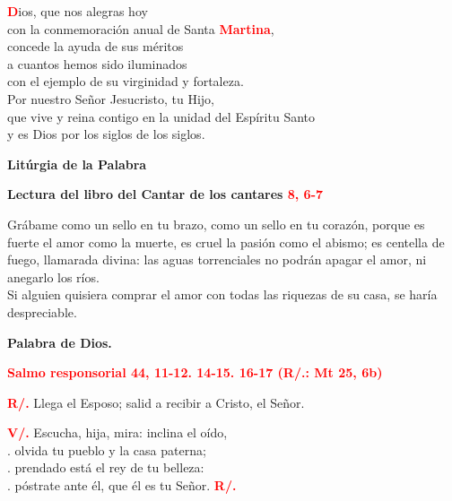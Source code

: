 \documentclass[12pt, letterpaper]{report}
\begin{document}
\lettrine[lines=1]{\bfseries \textcolor{red}{D}}{}\Large {ios,
que nos alegras hoy \\
con la conmemoraci\'on anual de Santa {\bfseries \textcolor{red}{Martina}}, \\
concede la ayuda de sus m\'eritos \\
a cuantos hemos sido iluminados \\
con el ejemplo de su virginidad y fortaleza. \\
Por nuestro Se\~nor Jesucristo, tu Hijo, \\
que vive y reina contigo en la unidad del Esp\'iritu Santo \\
y es Dios por los siglos de los siglos.}

\newpage

\begin{center}
\Huge {\bfseries Lit\'urgia de la Palabra}
\end{center}

\Large {\bfseries Lectura del libro del Cantar de los cantares \hspace{1cm} \textcolor{red}{8, 6-7}} \newline

\Large Gr\'abame como un sello en tu brazo, como un sello en tu coraz\'on, porque es fuerte el amor como la muerte, es cruel la pasi\'on como el abismo; es centella de fuego, llamarada divina: las aguas torrenciales no podr\'an apagar el amor, ni anegarlo los r\'ios. \\
Si alguien quisiera comprar el amor con todas las riquezas de su casa, se har\'ia despreciable. \newline

{\bfseries Palabra de Dios.} \newline


\Large {\bfseries \textcolor{red}{Salmo responsorial \hspace{1cm} 44, 11-12. 14-15. 16-17 (R/.: Mt 25, 6b)}} \newline

\Large {\bfseries \textcolor{red}{R/.}} \hspace{1cm} Llega el Esposo; salid a recibir a Cristo, el Se\~nor. \newline

{\bfseries \textcolor{red}{V/.}} \hspace{1cm} Escucha, hija, mira: inclina el o\'ido, \\
. \hspace{2.5cm} olvida tu pueblo y la casa paterna; \\
. \hspace{2.5cm} prendado est\'a el rey de tu belleza: \\
. \hspace{2.5cm} p\'ostrate ante \'el, que \'el es tu Se\~nor. \hspace{1cm} {\bfseries \textcolor{red}{R/.}} \newline
\end{document}
